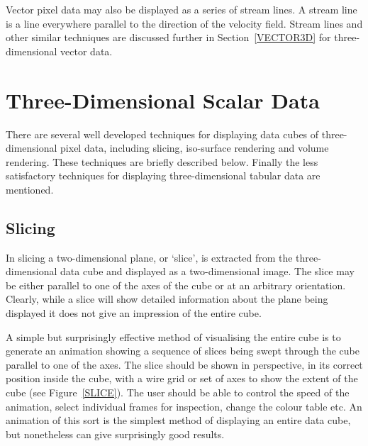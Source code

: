 \documentclass[twoside,11pt]{article}
\newcommand{\xlabel}[1]{}
\begin{document}
Vector pixel data may also be displayed as a series of stream lines.
A stream line is a line everywhere parallel to the direction of the
velocity field. Stream lines and other similar techniques are discussed
further in Section~\ref{VECTOR3D} for three-dimensional vector data.


\section{Three-Dimensional Scalar Data
\label{SCALAR3D} \xlabel{SCALAR3D} }

There are several well developed techniques for displaying data cubes
of three-dimensional pixel data, including slicing, iso-surface
rendering and volume rendering. These techniques are briefly described
below. Finally the less satisfactory techniques for displaying
three-dimensional tabular data are mentioned.

\subsection{Slicing}

In slicing a two-dimensional plane, or `slice', is extracted from the
three-dimensional data cube and displayed as a two-dimensional image.
The slice may be either parallel to one of the axes of the cube or at
an arbitrary orientation. Clearly, while a slice will show detailed
information about the plane being displayed it does not give an
impression of the entire cube.

A simple but surprisingly effective method of visualising the entire
cube is to generate an animation showing a sequence of slices being
swept through the cube parallel to one of the axes. The slice should be
shown in perspective, in its correct position inside the cube, with a
wire grid or set of axes to show the extent of the cube (see
Figure~\ref{SLICE}). The user should be able to control the speed of the
animation, select individual frames for inspection, change the colour
table etc. An animation of this sort is the simplest method of displaying
an entire data cube, but nonetheless can give surprisingly good results.
\end{document}
